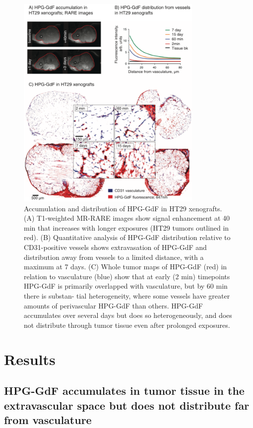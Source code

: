 \begin{figure}[htbp]   
 \begin{center}  
 \includegraphics[width=0.8\textwidth]{hpg/hpg-images/hpg_fig3-hpgdistribution.png}
 \caption{Accumulation and distribution of HPG-GdF in HT29 xenografts. (A) T1-weighted MR-RARE images show signal enhancement at 40 min that increases with longer exposures (HT29 tumors outlined in red). (B) Quantitative analysis of HPG-GdF distribution relative to CD31-positive vessels shows extravasation of HPG-GdF and distribution away from vessels to a limited distance, with a maximum at 7 days. (C) Whole tumor maps of HPG-GdF (red) in relation to vasculature (blue) show that at early (2 min) timepoints HPG-GdF is primarily overlapped with vasculature, but by 60 min there is substan- tial heterogeneity, where some vessels have greater amounts of perivascular HPG-GdF than others. HPG-GdF accumulates over several days but does so heterogeneously, and does not distribute through tumor tissue even after prolonged exposures.}  
 \label{hpgpaper:fig3}  
 \end{center}
\end{figure}

\section{Results}

\subsection{HPG-GdF accumulates in tumor tissue in the extravascular space but does not distribute far from vasculature}

